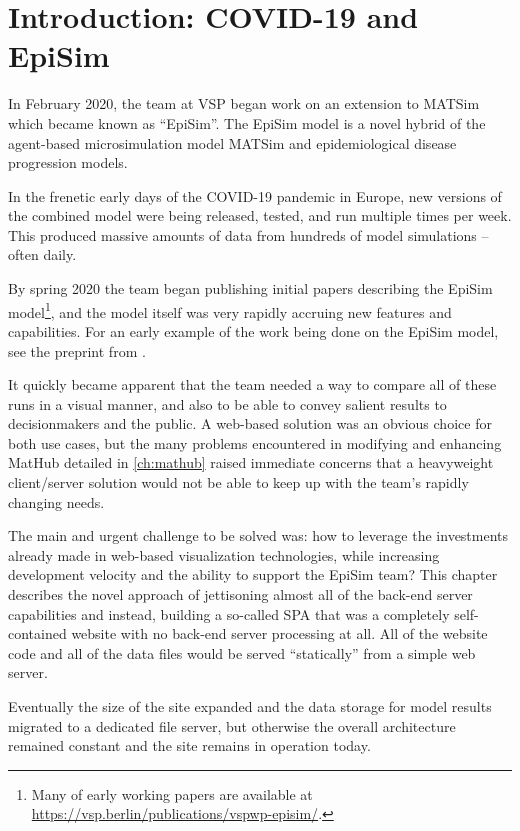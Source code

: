 \hypertarget{covid-introduction-covid-19-and-episim}{%
\section{Introduction: COVID-19 and EpiSim}\label{introduction-covid-19-and-episim}}

In February 2020, the team at VSP began work on an extension to MATSim which became known as ``EpiSim''. The EpiSim model is a novel hybrid of the agent-based microsimulation model MATSim and epidemiological disease progression models.

In the frenetic early days of the COVID-19 pandemic in Europe, new versions of the combined model were being released, tested, and run multiple times per week. This produced massive amounts of data from hundreds of model simulations -- often daily.

By spring 2020 the team began publishing initial papers describing the EpiSim model\footnote{Many of early working papers are available at \url{https://vsp.berlin/publications/vspwp-episim/}.}, and the model itself was very rapidly accruing new features and capabilities. For an early example of the work being done on the EpiSim model, see the preprint from \cite{MuellerEtAl2020MobilityTracesAndCovid19}.

It quickly became apparent that the team needed a way to compare all of these runs in a visual manner, and also to be able to convey salient results to decisionmakers and the public. A web-based solution was an obvious choice for both use cases, but the many problems encountered in modifying and enhancing MatHub detailed in \autoref{ch:mathub} raised immediate concerns that a heavyweight client/server solution would not be able to keep up with the team's rapidly changing needs.

The main and urgent challenge to be solved was: how to leverage the investments already made in web-based visualization technologies, while increasing development velocity and the ability to support the EpiSim team? This chapter describes the novel approach of jettisoning almost all of the back-end server capabilities and instead, building a so-called \gls{SPA} that was a completely self-contained website with no back-end server processing at all. All of the website code and all of the data files would be served ``statically'' from a simple web server.

Eventually the size of the site expanded and the data storage for model results migrated to a dedicated file server, but otherwise the overall architecture remained constant and the site remains in operation today.

